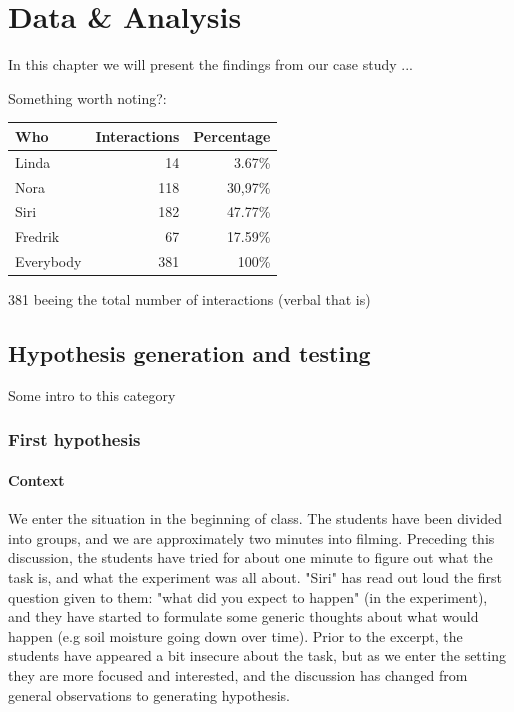 \chapter{Data \& Analysis}
In this chapter we will present the findings from our case study ...

Something worth noting?:
\begin{table}[H]
\begin{center}
	\begin{tabular}{l r r } \toprule
	Who &  Interactions  & Percentage\\ \midrule  
	Linda &	 14  & 3.67\% \\
	Nora&	118 & 30,97\% \\ 
	Siri& 	182 & 47.77\% \\
	Fredrik& 67 & 17.59\% \\ \midrule
	Everybody &	381 & 100\%\\
	\bottomrule
	\end{tabular}
\end{center}
\end{table}
381 beeing the total number of interactions (verbal that is)



\section{Hypothesis generation and testing}
Some intro to this category
\subsection{First hypothesis}
\subsubsection*{Context}
\label{firsthypothesis}
We enter the situation in the beginning of class. The students have been divided into groups, and we are approximately two minutes into filming. Preceding this discussion, the students have tried for about one minute to figure out what the task is, and what the experiment was all about. "Siri" has read out loud the first question given to them: "what did you expect to happen" (in the experiment), and they have started to formulate some generic thoughts about what would happen (e.g soil moisture going down over time). Prior to the excerpt, the students have appeared a bit insecure about the task, but as we enter the setting they are more focused and interested, and the discussion has changed from general observations to generating hypothesis.

